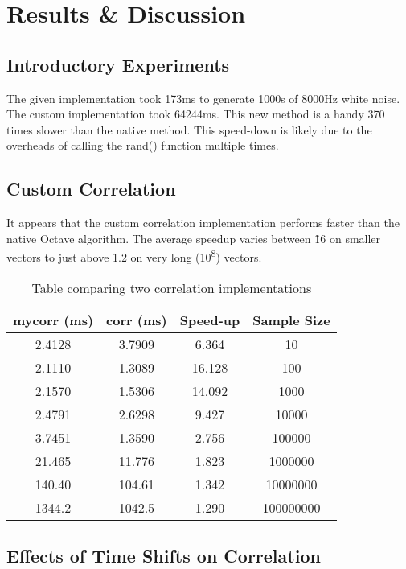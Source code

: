 \section{Results \& Discussion}

\subsection{Introductory Experiments}

The given implementation took 173ms to generate 1000s of 8000Hz white noise. The custom implementation took 64244ms. This new method is a handy 370 times slower than the native method. This speed-down is likely due to the overheads of calling the rand() function multiple times.

\subsection{Custom Correlation}
It appears that the custom correlation implementation performs faster than the native Octave algorithm. The average speedup varies between \~16 on smaller vectors to just above 1.2 on very long (10\textsuperscript{8}) vectors.


\begin{table}[h]
\centering
\begin{tabular}{|c|c|c|c|}
\hline
\textbf{mycorr (ms)} & \textbf{corr (ms)} & \textbf{Speed-up} & \textbf{Sample Size}  \\
\hline

2.4128 &  3.7909 &  6.364 &  10 \\ \hline
2.1110 &  1.3089 &  16.128 &  100 \\ \hline
2.1570 &  1.5306 &  14.092 &  1000 \\ \hline
2.4791 &  2.6298 &  9.427 &  10000 \\ \hline
3.7451 &  1.3590 &  2.756 &  100000 \\ \hline
21.465 &  11.776 &  1.823 &  1000000 \\ \hline
140.40 &  104.61 &  1.342 &  10000000 \\ \hline
1344.2 &  1042.5 &  1.290 &  100000000 \\ \hline



\end{tabular}
\caption{Table comparing two correlation implementations}
\label{tab:comparison}
\end{table}


\subsection{Effects of Time Shifts on Correlation}

